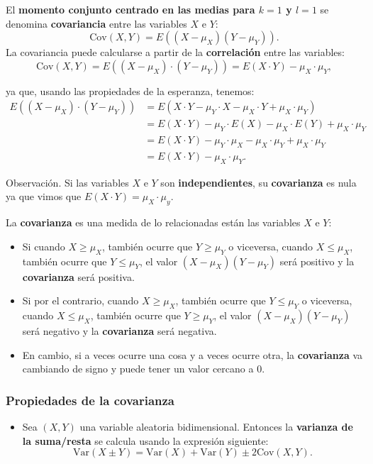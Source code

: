 \documentclass[]{book}
\providecommand{\tightlist}{%
  \setlength{\itemsep}{0pt}\setlength{\parskip}{0pt}}
\begin{document}
El \textbf{momento conjunto centrado en las medias para \(k=1\) y \(l=1\)} se denomina \textbf{covariancia} entre las variables \(X\) e \(Y\):
\[
\mathrm{Cov}(X,Y)=E((X-\mu_X)(Y-\mu_Y)).
\]
La covariancia puede calcularse a partir de la \textbf{correlación} entre las variables:
\[
\mathrm{Cov}(X,Y)=E((X-\mu_X) \cdot (Y-\mu_Y))=E(X\cdot Y)-\mu_X\cdot \mu_Y,
\]

ya que, usando las propiedades de la esperanza, tenemos:
\[
\begin{array}{rl}
E((X-\mu_X)\cdot (Y-\mu_Y)) & =E(X\cdot Y-\mu_Y \cdot X-\mu_X \cdot Y+\mu_X\cdot \mu_Y)\\ & =E(X\cdot Y)-\mu_Y\cdot E(X)-\mu_X \cdot E(Y)+\mu_X\cdot \mu_Y \\ &  = E(X\cdot Y)-\mu_Y\cdot \mu_X-\mu_X \cdot \mu_Y+\mu_X\cdot \mu_Y \\ & = E(X\cdot Y)-\mu_X\cdot \mu_Y.
\end{array}
\]

Observación.
Si las variables \(X\) e \(Y\) son \textbf{independientes}, su \textbf{covarianza} es nula ya que vimos que \(E(X\cdot Y)=\mu_X\cdot \mu_y\).

La \textbf{covarianza} es una medida de lo relacionadas están las variables \(X\) e \(Y\):

\begin{itemize}
\item
  Si cuando \(X\geq \mu_X\), también ocurre que \(Y\geq \mu_Y\) o viceversa, cuando \(X\leq \mu_X\), también ocurre que \(Y\leq \mu_Y\), el valor \((X-\mu_X)(Y-\mu_Y)\) será positivo y la \textbf{covarianza} será positiva.
\item
  Si por el contrario, cuando \(X\geq \mu_X\), también ocurre que \(Y\leq \mu_Y\) o viceversa, cuando \(X\leq \mu_X\), también ocurre que \(Y\geq \mu_Y\), el valor \((X-\mu_X)(Y-\mu_Y)\) será negativo y la \textbf{covarianza} será negativa.
\item
  En cambio, si a veces ocurre una cosa y a veces ocurre otra, la \textbf{covarianza} va cambiando de signo y puede tener un valor cercano a 0.
\end{itemize}

\hypertarget{propiedades-de-la-covarianza}{%
\subsubsection{Propiedades de la covarianza}\label{propiedades-de-la-covarianza}}

\begin{itemize}
\tightlist
\item
  Sea \((X,Y)\) una variable aleatoria bidimensional. Entonces la \textbf{varianza de la suma/resta} se calcula usando la expresión siguiente:
  \[
  \mathrm{Var}(X\pm Y)=\mathrm{Var}(X)+\mathrm{Var}(Y)\pm 2 \mathrm{Cov}(X,Y).
  \]
\end{itemize}
\end{document}
